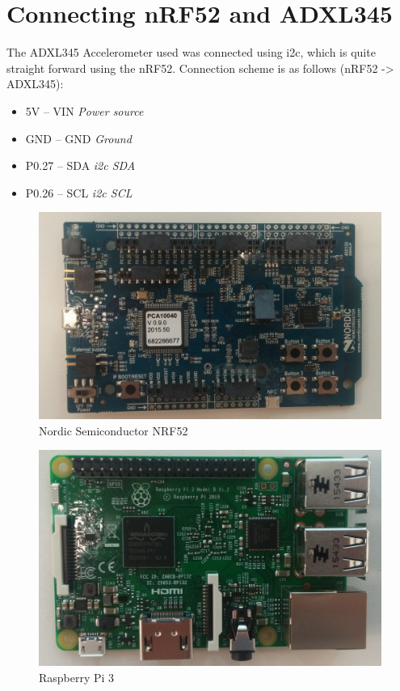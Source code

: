 \section{Connecting nRF52 and ADXL345}

The ADXL345 Accelerometer used was connected using \gls{i2c}, which is quite straight forward using the nRF52. Connection scheme is as follows (nRF52 -> ADXL345): 

\begin{itemize}
  \item 5V -- VIN			\textit{Power source}
  \item GND -- GND 			\textit{Ground}
  \item P0.27 -- SDA		\textit{\gls{i2c} SDA}
  \item P0.26 -- SCL		\textit{\gls{i2c} SCL}
\end{itemize} 




\begin{figure}[h]
    \centering
    \includegraphics[scale=0.32]{nrf52.png}    \caption{Nordic Semiconductor NRF52}
    \label{fig:adxl345}
\end{figure}

\begin{figure}[h]
    \centering
    \includegraphics[scale=0.35]{pi3.png}    \caption{Raspberry Pi 3}
    \label{fig:adxl345}
\end{figure}

